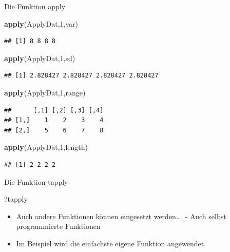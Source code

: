 \documentclass[ignorenonframetext,]{beamer}
\newenvironment{Shaded}{}{}
\newcommand{\KeywordTok}[1]{\textcolor[rgb]{0.00,0.44,0.13}{\textbf{{#1}}}}
\newcommand{\DecValTok}[1]{\textcolor[rgb]{0.25,0.63,0.44}{{#1}}}
\newcommand{\NormalTok}[1]{{#1}}
\providecommand{\tightlist}{%
\setlength{\itemsep}{0pt}\setlength{\parskip}{0pt}}
\begin{document}
\begin{frame}[fragile]{Die Funktion apply}

\begin{Shaded}
\begin{Highlighting}[]
\KeywordTok{apply}\NormalTok{(ApplyDat,}\DecValTok{1}\NormalTok{,var)}
\end{Highlighting}
\end{Shaded}

\begin{verbatim}
## [1] 8 8 8 8
\end{verbatim}

\begin{Shaded}
\begin{Highlighting}[]
\KeywordTok{apply}\NormalTok{(ApplyDat,}\DecValTok{1}\NormalTok{,sd)}
\end{Highlighting}
\end{Shaded}

\begin{verbatim}
## [1] 2.828427 2.828427 2.828427 2.828427
\end{verbatim}

\begin{Shaded}
\begin{Highlighting}[]
\KeywordTok{apply}\NormalTok{(ApplyDat,}\DecValTok{1}\NormalTok{,range)}
\end{Highlighting}
\end{Shaded}

\begin{verbatim}
##      [,1] [,2] [,3] [,4]
## [1,]    1    2    3    4
## [2,]    5    6    7    8
\end{verbatim}

\begin{Shaded}
\begin{Highlighting}[]
\KeywordTok{apply}\NormalTok{(ApplyDat,}\DecValTok{1}\NormalTok{,length)}
\end{Highlighting}
\end{Shaded}

\begin{verbatim}
## [1] 2 2 2 2
\end{verbatim}

\end{frame}

\begin{frame}[fragile]{Die Funktion tapply}

\begin{Shaded}
\begin{Highlighting}[]
\NormalTok{?tapply}
\end{Highlighting}
\end{Shaded}

\begin{itemize}
\tightlist
\item
  Auch andere Funktionen können eingesetzt werden\ldots{}. - Auch selbst
  programmierte Funktionen
\item
  Im Beispiel wird die einfachste eigene Funktion angewendet.
\end{itemize}

\end{frame}
\end{document}
